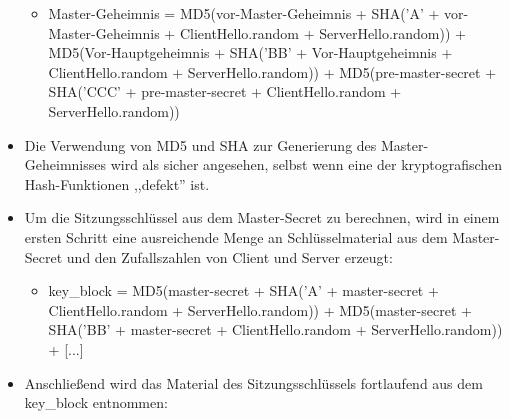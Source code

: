 \documentclass[a4paper]{article}
\begin{document}
\begin{multicols}{3}
\begin{itemize}
              \begin{itemize}
                  \item
                        Master-Geheimnis = MD5(vor-Master-Geheimnis + SHA('A' +
                        vor-Master-Geheimnis + ClientHello.random + ServerHello.random)) +
                        MD5(Vor-Hauptgeheimnis + SHA('BB' + Vor-Hauptgeheimnis +
                        ClientHello.random + ServerHello.random)) + MD5(pre-master-secret +
                        SHA('CCC' + pre-master-secret + ClientHello.random +
                        ServerHello.random))
              \end{itemize}
        \item
              Die Verwendung von MD5 und SHA zur Generierung des Master-Geheimnisses
              wird als sicher angesehen, selbst wenn eine der kryptografischen
              Hash-Funktionen ,,defekt'' ist.
        \item
              Um die Sitzungsschlüssel aus dem Master-Secret zu berechnen, wird in
              einem ersten Schritt eine ausreichende Menge an Schlüsselmaterial aus
              dem Master-Secret und den Zufallszahlen von Client und Server erzeugt:

              \begin{itemize}
                  \item
                        key\_block = MD5(master-secret + SHA('A' + master-secret +
                        ClientHello.random + ServerHello.random)) + MD5(master-secret +
                        SHA('BB' + master-secret + ClientHello.random + ServerHello.random))
                        + {[}...{]}
              \end{itemize}
        \item
              Anschließend wird das Material des Sitzungsschlüssels fortlaufend aus
              dem key\_block entnommen:


\end{itemize}
\end{multicols}
\end{document}
